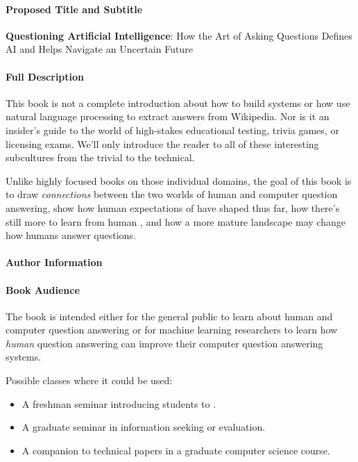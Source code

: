 
\clearpage

\paragraph{Proposed Title and Subtitle} \vspace{3cm}

{\bf Questioning Artificial Intelligence}: How the Art of Asking Questions Defines AI and Helps Navigate an Uncertain Future

\vspace{3cm}


\paragraph{Full Description}



This book is not a complete introduction about how to build  systems
or how use natural language processing to extract answers from Wikipedia.
%
Nor is it an insider's guide to the world of high-stakes educational testing,
trivia games, or licensing exams.
%
We'll only introduce the reader to all of these interesting subcultures
from the trivial to the technical.

Unlike highly focused books on those individual domains, the goal of this book is to
draw \emph{connections} between the two worlds of human and computer
question answering, show how human expectations of  have
shaped  thus far, how there's still more to learn from
human , and how a more mature  landscape may change
how humans answer questions.


\paragraph{Author Information}



\paragraph{Book Audience}

The book is intended either for the general public to learn about human and computer
question answering or for machine learning researchers to learn
how \emph{human} question answering can improve their computer question
answering systems.

Possible classes where it could be used:
\begin{itemize}
        \item A freshman seminar introducing students to .
        \item A graduate seminar in information seeking or evaluation.
        \item A companion to technical papers in a graduate computer science course.
\end{itemize}

